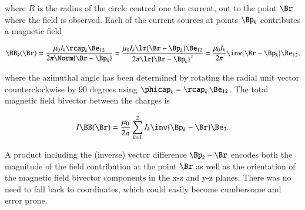 where \( R \) is the radius of the circle centred one the current, out to the point \( \Br \) where the field is observed.
Each of the current sources at points \( \Bp_k \) contributes a magnetic field

\begin{dmath}\label{eqn:maxwells:80}
\BB_k(\Br)
= \frac{\mu_0 I_k \rcap_k \Be_{12} }{2 \pi \Norm{ \Br - \Bp_k} }
= \frac{\mu_0 I_k \lr{ \Br - \Bp_k} \Be_{12} }{2 \pi \lr{ \Br - \Bp_k}^2 }
= \frac{\mu_0 I_k}{2\pi} \inv{ \Br - \Bp_k} \Be_{12},
\end{dmath}

where the azimuthal angle has been determined by rotating the radial unit vector counterclockwise by 90 degrees using \( \phicap_k = \rcap_k\, \Be_{12} \).
The total magnetic field bivector between the charges is

\begin{equation}\label{eqn:maxwells:100}
I \BB(\Br)
= \frac{\mu_0}{2\pi} \sum_{k = 1}^2 I_k \inv{\Bp_k - \Br } \Be_3.
\end{equation}

A product including the (inverse) vector difference \( \Bp_k - \Br \) encodes both the magnitude of the field contribution at the point \( \Br \) as well as the orientation of the magnetic field bivector components in the x-z and y-z planes.
There was no need to fall back to coordinates, which could easily become cumbersome and error prone.
